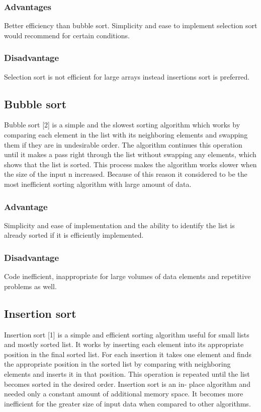 \documentclass{article}
\begin{document}
\subsubsection{Advantages}
Better efficiency than bubble sort. 
Simplicity and ease to implement selection sort would recommend for certain conditions.

\subsubsection{Disadvantage}
Selection sort is not efficient for large arrays instead insertions sort is preferred.

\subsection{Bubble sort}
Bubble sort [2] is a simple and the slowest sorting algorithm which works by comparing each element in the list with its neighboring elements and swapping them if they are in undesirable order. The algorithm continues this operation until it makes a pass right through the list without swapping any elements, which shows that the list is sorted. This process makes the algorithm works slower when the size of the input n increased. Because of this reason it considered to be the most inefficient sorting algorithm with large amount of data.

\subsubsection{Advantage}
Simplicity and ease of implementation and the ability to identify the list is already sorted if it is efficiently implemented.

\subsubsection{Disadvantage}
Code inefficient, inappropriate for large volumes of data elements and repetitive problems as well.

\subsection{Insertion sort}
Insertion sort [1] is a simple and efficient sorting algorithm useful for small lists and mostly sorted list. It works by inserting each element into its appropriate position in the final sorted list. For each insertion it takes one element and finds the appropriate position in the sorted list by comparing with neighboring elements and inserts it in that position. This operation is repeated until the list becomes sorted in the desired order. Insertion sort is an in- place algorithm and needed only a constant amount of additional memory space. It becomes more inefficient for the greater size of input data when compared to other algorithms.
\end{document}
